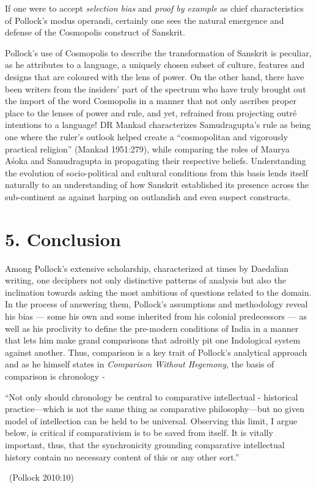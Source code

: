 If one were to accept \textit{selection bias} and \textit{proof by example} as chief characteristics of Pollock’s modus operandi, certainly one sees the natural emergence and defense of the Cosmopolis construct of Sanskrit.

Pollock’s use of Cosmopolis to describe the transformation of Sanskrit is peculiar, as he attributes to a language, a uniquely chosen subset of culture, features and designs that are coloured with the lens of power. On the other hand, there have been writers from the insiders’ part of the spectrum who have truly brought out the import of the word Cosmopolis in a manner that not only ascribes proper place to the lenses of power and rule, and yet, refrained from projecting outré intentions to a language! DR Mankad characterizes Samudragupta’s rule as being one where the ruler’s outlook helped create a “cosmopolitan and vigorously practical religion” (Mankad 1951:279), while comparing the roles of Maurya Aśoka and Samudragupta in propagating their respective beliefs. Understanding the evolution of socio-political and cultural conditions from this basis lends itself naturally to an understanding of how Sanskrit established its presence across the sub-continent as against harping on outlandish and even suspect constructs.



\section*{5. Conclusion}

Among Pollock’s extensive scholarship, characterized at times by Daedalian writing, one deciphers not only distinctive patterns of analysis but also the inclination towards asking the most ambitious of questions related to the domain. In the process of answering them, Pollock’s assumptions and methodology reveal his bias — some his own and some inherited from his colonial predecessors — as well as his proclivity to define the pre-modern conditions of India in a manner that lets him make grand comparisons that adroitly pit one Indological system against another. Thus, comparison is a key trait of Pollock’s analytical approach and as he himself states in \textit{Comparison Without Hegemony}, the basis of comparison is chronology -

\begin{myquote}
“Not only should chronology be central to comparative intellectual - historical practice—which is not the same thing as comparative philosophy—but no given model of intellection can be held to be universal. Observing this limit, I argue below, is critical if comparativism is to be saved from itself. It is vitally important, thus, that the synchronicity grounding comparative intellectual history contain no necessary content of this or any other sort.” 

~\hfill (Pollock 2010:10)
\end{myquote}


